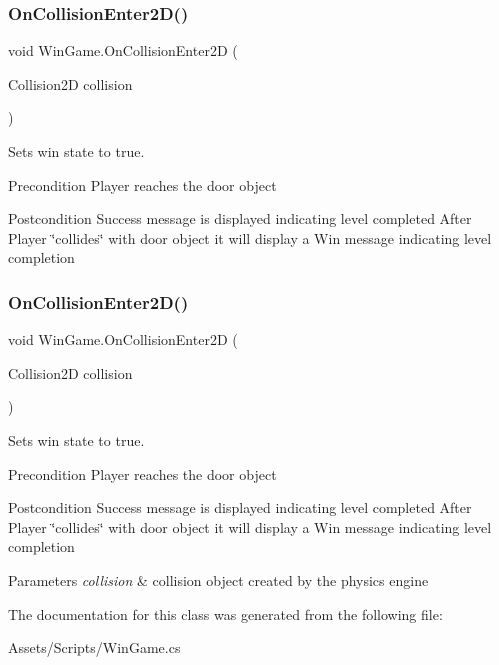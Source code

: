\subsubsection{\texorpdfstring{On\+Collision\+Enter2\+D()}{OnCollisionEnter2D()}\hspace{0.1cm}{\footnotesize\ttfamily [1/2]}}
{\footnotesize\ttfamily void Win\+Game.\+On\+Collision\+Enter2D (\begin{DoxyParamCaption}\item[{Collision2D}]{collision }\end{DoxyParamCaption})\hspace{0.3cm}{\ttfamily [inline]}}

Sets win state to true. \begin{DoxyPrecond}{Precondition}
Player reaches the door object 
\end{DoxyPrecond}
\begin{DoxyPostcond}{Postcondition}
Success message is displayed indicating level completed After Player \char`\"{}collides\char`\"{} with door object it will display a Win message indicating level completion 
\end{DoxyPostcond}
\mbox{\label{class_win_game_a20f3871fd050c6da54d041b49a7fb063}} 
\subsubsection{\texorpdfstring{On\+Collision\+Enter2\+D()}{OnCollisionEnter2D()}\hspace{0.1cm}{\footnotesize\ttfamily [2/2]}}
{\footnotesize\ttfamily void Win\+Game.\+On\+Collision\+Enter2D (\begin{DoxyParamCaption}\item[{Collision2D}]{collision }\end{DoxyParamCaption})\hspace{0.3cm}{\ttfamily [inline]}}

Sets win state to true. \begin{DoxyPrecond}{Precondition}
Player reaches the door object 
\end{DoxyPrecond}
\begin{DoxyPostcond}{Postcondition}
Success message is displayed indicating level completed After Player \char`\"{}collides\char`\"{} with door object it will display a Win message indicating level completion 
\end{DoxyPostcond}

\begin{DoxyParams}{Parameters}
{\em collision} & collision object created by the physics engine \\
\hline
\end{DoxyParams}


The documentation for this class was generated from the following file\+:\begin{DoxyCompactItemize}
\item 
Assets/\+Scripts/Win\+Game.\+cs\end{DoxyCompactItemize}
